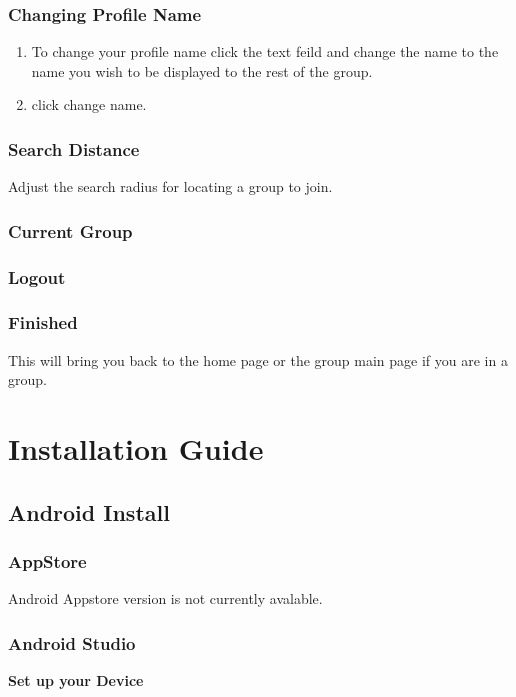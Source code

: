  \subsubsection{Changing Profile Name}
 \begin{enumerate}
 \item To change your profile name click the text feild and change the name to the name you wish to be displayed to the rest of the group.
 \item click change name.
 \end{enumerate}
 
 \subsubsection{Search Distance}
 Adjust the search radius for locating a group to join.
 
 \subsubsection{Current Group}
 
 
 \subsubsection{Logout}
 
 \subsubsection{Finished}
 This will bring you back to the home page or the group main page if you are in a group.


\section{Installation Guide}
\subsection{Android Install}
\subsubsection{AppStore} 
Android Appstore version is not currently avalable.

\subsubsection{Android Studio}

\textbf{Set up your Device}

